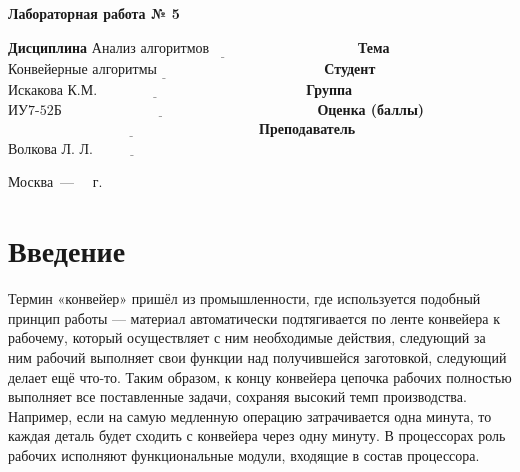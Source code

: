 \documentclass[12pt]{report}
\begin{document}
\begin{center}
\Large\textbf{Лабораторная работа № 5}
\end{center}
\vspace{\baselineskip}
\noindent\textbf{Дисциплина} $\underline{\text{Анализ алгоритмов~~~~~~~~~~~~~~~~~~~~~~~~~~~~~~~}}$\newline\newline
\noindent\textbf{Тема} $\underline{\text{Конвейерные алгоритмы~~~~~~~~~~~~~~~~~~~~~~~~~~~~~~~~~~~}}$\newline\newline
\noindent\textbf{Студент} $\underline{\text{Искакова К.М.~~~~~~~~~~~~~~~~~~~~~~~~~~~~~~~~~~~~~~~~~~~~}}$\newline\newline
\noindent\textbf{Группа} $\underline{\text{ИУ7-52Б~~~~~~~~~~~~~~~~~~~~~~~~~~~~~~~~~~~~~~~~~~~~~~~~~~~~~~}}$\newline\newline
\noindent\textbf{Оценка (баллы)} $\underline{\text{~~~~~~~~~~~~~~~~~~~~~~~~~~~~~~~~~~~~~~~~~~~~~~~~~~~~~}}$\newline\newline
\noindent\textbf{Преподаватель} $\underline{\text{Волкова Л. Л.~~~~~~~~~~~~~~~~~~~~~~~~~~~~~~~~~~~}}$\newline

\begin{center}
	\vfill
	Москва~---~\the\year
	~г.
\end{center}
\clearpage

%
\renewcommand\contentsname{Содержание}

\tableofcontents

\newpage
\chapter*{Введение}

Термин «конвейер» пришёл из промышленности, где используется подобный принцип работы — материал автоматически подтягивается по ленте конвейера к рабочему, который осуществляет с ним необходимые действия, следующий за ним рабочий выполняет свои функции над получившейся заготовкой, следующий делает ещё что-то. Таким образом, к концу конвейера цепочка рабочих полностью выполняет все поставленные задачи, сохраняя высокий темп производства. Например, если на самую медленную операцию затрачивается одна минута, то каждая деталь будет сходить с конвейера через одну минуту. В процессорах роль рабочих исполняют функциональные модули, входящие в состав процессора.
\end{document}

